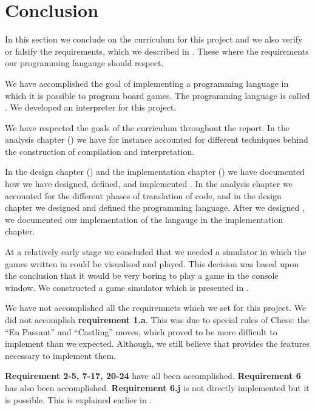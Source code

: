 \chapter{Conclusion}
\label{chap:conclusion}

In this section we conclude on the curriculum for this project and we also
verify or falsify the requirements, which we described in
. These where the requirements our programming
langauge should respect.

We have accomplished the goal of implementing a programming language in which it
is possible to program board games. The programming language is called
\productname{}. We developed an interpreter for this project.

We have respected the goals of the curriculum throughout the report. In the
analysis chapter () we have for instance accounted for
different techniques behind the construction of compilation and interpretation.

In the design chapter () and the implementation chapter
() we have documented how we have designed, defined,
and implemented \productname{}. In the analysis chapter we accounted for the
different phases of translation of code, and in the design chapter we designed
and defined the programming language. After we designed \productname{}, we
documented our implementation of the langauge in the implementation chapter.

At a relatively early stage we concluded that we needed a simulator in which the
games written in \productname{} could be visualised and played. This decision
was based upon the conclusion that it would be very boring to play a game in the
console window. We constructed a game simulator which is presented in
.

We have not accomplished all the requiremnets which we set for this project. We
did not accomplish \textbf{requirement 1.a}. This was due to special rules of
Chess: the ``En Passant'' and ``Castling'' moves, which proved to be more
difficult to implement than we expected. Although, we still believe that
\productname{} provides the features necessary to implement them.

\textbf{Requirement 2-5, 7-17, 20-24} have all been accomplished.
\textbf{Requirement 6} has also been accomplished. \textbf{Requirement 6.j} is not
directly implemented but it is possible. This is explained earlier in
.

